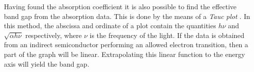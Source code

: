 Having found the absorption coefficient it is also possible to find the effective band gap from the absorption data. This is done by the means of a \emph{Tauc plot} \cite{Tauc1968}. In this method, the abscissa and ordinate of a plot contain the quantities $h\nu$ and $\sqrt{\alpha h\nu}$ respectively, where $\nu$ is the frequency of the light. If the data is obtained from an indirect semiconductor performing an allowed electron transition, then a part of the graph will be linear. Extrapolating this linear function to the energy axis will yield the band gap. 






































